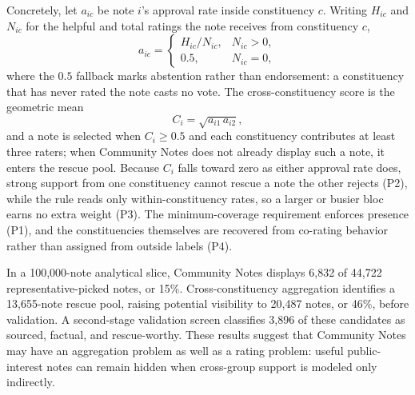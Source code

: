 \documentclass[10pt,twocolumn]{article}
\begin{document}
Concretely, let $a_{ic}$ be note $i$'s approval rate inside constituency $c$.
Writing $H_{ic}$ and $N_{ic}$ for the helpful and total ratings the note receives
from constituency $c$,
\[
a_{ic} =
\begin{cases}
H_{ic}/N_{ic}, & N_{ic} > 0,\\
0.5, & N_{ic} = 0,
\end{cases}
\]
where the $0.5$ fallback marks abstention rather than endorsement: a constituency
that has never rated the note casts no vote. The cross-constituency score is the
geometric mean
\[
    C_i = \sqrt{a_{i1}\,a_{i2}},
\]
and a note is selected when $C_i \geq 0.5$ and each constituency contributes at
least three raters; when Community Notes does not already display such a note, it
enters the rescue pool. Because $C_i$ falls toward zero as either approval rate
does, strong support from one constituency cannot rescue a note the other
rejects (P2), while the rule reads only within-constituency rates, so a larger or
busier bloc earns no extra weight (P3). The minimum-coverage requirement enforces
presence (P1), and the constituencies themselves are recovered from co-rating
behavior rather than assigned from outside labels (P4).

In a 100,000-note analytical slice, Community Notes displays 6,832 of 44,722
representative-picked notes, or 15\%. Cross-constituency aggregation identifies
a 13,655-note rescue pool, raising potential visibility to 20,487 notes, or
46\%, before validation. A second-stage validation screen classifies 3,896 of
these candidates as sourced, factual, and rescue-worthy. These results suggest
that Community Notes may have an aggregation problem as well as a rating
problem: useful public-interest notes can remain hidden when cross-group
support is modeled only indirectly.



\end{document}
